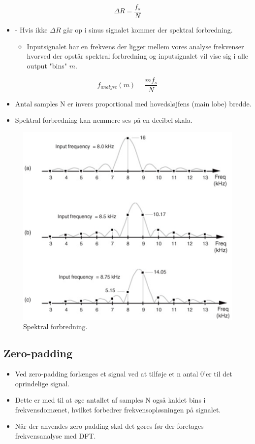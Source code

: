 \documentclass[danish]{article}
\begin{document}
\begin{equation}
\Delta R=\frac{f_s}{N}
\end{equation}

\begin{itemize}
	\item -	Hvis ikke $\Delta R$ går op i sinus signalet kommer der spektral forbredning. 
	\begin{itemize}
		\item Inputsignalet har en frekvens der ligger mellem vores analyse frekvenser hvorved der opstår spektral forbredning og inputsignalet vil vise sig i alle output "bins" $m$.
	\end{itemize}
\end{itemize}

\begin{equation}
f_{analyse}(m)=\frac{m f_s}{N}
\end{equation}

\begin{itemize}
	\item Antal samples N er invers proportional med hovedsløjfens (main lobe) bredde.
	\item Spektral forbredning kan nemmere ses på en decibel skala.
\end{itemize}

\begin{figure}[H]
	\centering
	\includegraphics[width=0.6\linewidth]{graphics/leakage}
	\caption{Spektral forbredning.}
	\label{fig:leakage}
\end{figure}

\subsection{Zero-padding}
\begin{itemize}
	\item Ved zero-padding forlænges et signal ved at tilføje et n antal 0'er til det oprindelige signal. 
	\item Dette er med til at øge antallet af samples N også kaldet bins i frekvensdomænet, hvilket forbedrer frekvensopløsningen på signalet.
	\item Når der anvendes zero-padding skal det gøres før der foretages frekvensanalyse med DFT.
\end{itemize}
\end{document}
